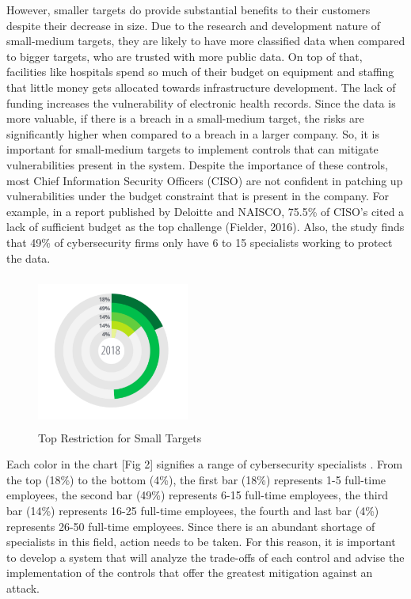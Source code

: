 However, smaller targets do provide substantial benefits to their customers despite their decrease in size. Due to the research and development nature of small-medium targets, they are likely to have more classified data when compared to bigger targets, who are trusted with more public data. On top of that, facilities like hospitals spend so much of their budget on equipment and staffing that little money gets allocated towards infrastructure development. The lack of funding increases the vulnerability of electronic health records. Since the data is more valuable, if there is a breach in a small-medium target, the risks are significantly higher when compared to a breach in a larger company. So, it is important for small-medium targets to implement controls that can mitigate vulnerabilities present in the system. Despite the importance of these controls, most Chief Information Security Officers (CISO) are not confident in patching up vulnerabilities under the budget constraint that is present in the company. For example, in a report published by Deloitte and NAISCO, 75.5\% of CISO’s cited a lack of sufficient budget as the top challenge (Fielder, 2016). Also, the study finds that 49\% of cybersecurity firms only have 6 to 15 specialists working to protect the data. 

\begin{figure}[ht]%
\centering
\includegraphics[width=5cm,height=5cm]{Images/expertise.png}
\caption{Top Restriction for Small Targets \cite{noauthor_deloitte_nodate}}%
\end{figure}

Each color in the chart [Fig 2] signifies a range of cybersecurity specialists . From the top (18\%) to the bottom (4\%), the first bar (18\%) represents 1-5 full-time employees, the second bar (49\%) represents 6-15 full-time employees, the third bar (14\%) represents 16-25 full-time employees, the fourth and last bar (4\%) represents 26-50 full-time employees. Since there is an abundant shortage of specialists in this field, action needs to be taken. For this reason, it is important to develop a system that will analyze the trade-offs of each control and advise the implementation of the controls that offer the greatest mitigation against an attack. 

